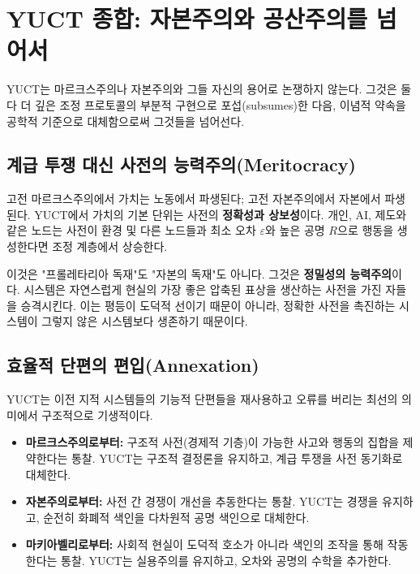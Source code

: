 \documentclass[12pt,a4paper]{article}
\begin{document}
	\section{YUCT 종합: 자본주의와 공산주의를 넘어서}
	\label{sec:yuct-synthesis}
	
	YUCT는 마르크스주의나 자본주의와 그들 자신의 용어로 논쟁하지 않는다. 그것은 둘 다 더 깊은 조정 프로토콜의 부분적 구현으로 포섭(subsumes)한 다음, 이념적 약속을 공학적 기준으로 대체함으로써 그것들을 넘어선다.
	
	\subsection{계급 투쟁 대신 사전의 능력주의(Meritocracy)}
	
	고전 마르크스주의에서 가치는 노동에서 파생된다; 고전 자본주의에서 자본에서 파생된다. YUCT에서 가치의 기본 단위는 사전의 \textbf{정확성과 상보성}이다. 개인, AI, 제도와 같은 노드는 사전이 환경 및 다른 노드들과 최소 오차 \(\varepsilon\)와 높은 공명 \(R\)으로 행동을 생성한다면 조정 계층에서 상승한다.
	
	이것은 "프롤레타리아 독재"도 "자본의 독재"도 아니다. 그것은 \textbf{정밀성의 능력주의}이다. 시스템은 자연스럽게 현실의 가장 좋은 압축된 표상을 생산하는 사전을 가진 자들을 승격시킨다. 이는 평등이 도덕적 선이기 때문이 아니라, 정확한 사전을 촉진하는 시스템이 그렇지 않은 시스템보다 생존하기 때문이다.
	
	\subsection{효율적 단편의 편입(Annexation)}
	
	YUCT는 이전 지적 시스템들의 기능적 단편들을 재사용하고 오류를 버리는 최선의 의미에서 구조적으로 기생적이다.
	
	\begin{itemize}[leftmargin=*]
		\item \textbf{마르크스주의로부터:} 구조적 사전(경제적 기층)이 가능한 사고와 행동의 집합을 제약한다는 통찰. YUCT는 구조적 결정론을 유지하고, 계급 투쟁을 사전 동기화로 대체한다.
		\item \textbf{자본주의로부터:} 사전 간 경쟁이 개선을 추동한다는 통찰. YUCT는 경쟁을 유지하고, 순전히 화폐적 색인을 다차원적 공명 색인으로 대체한다.
		\item \textbf{마키아벨리로부터:} 사회적 현실이 도덕적 호소가 아니라 색인의 조작을 통해 작동한다는 통찰. YUCT는 실용주의를 유지하고, 오차와 공명의 수학을 추가한다.
	\end{itemize}
	
\end{document}
